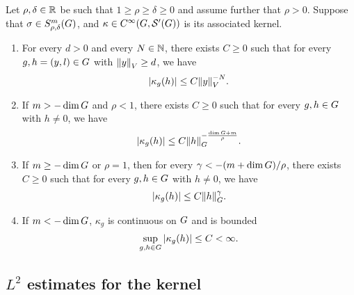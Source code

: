 \begin{theorem}
\label{theorem:kernel_estimates}
    Let $\rho, \delta \in \R$ be such that $1 \geq \rho \geq \delta \geq 0$
    and assume further that $\rho > 0$.
    Suppose that $\sigma \in \SymbolClass{m}{\rho, \delta}$,
    and $\kappa \in \SmoothFunctions {\Group, \TemperedDistributions \Group}$ is its associated kernel.
    \begin{enumerate}
        \item \label{item:kernel_estimates:at_infinity}
            For every $d > 0$ and every $N \in \N$,
            there exists $C \geq 0$ such that for every $g, h = (y, l) \in \Group$ with $\norm {y} \geq d$, we have
            \begin{align*}
                \abs{\kappa_g(h)} \leq C \norm y^{-N}.
            \end{align*}
        \item \label{item:kernel_estimates:at_origin:positive}
            If $m > - \dim \Group$ and $\rho < 1$, there exists $C \geq 0$ such that for every $g, h \in \Group$ with $h \neq 0$, we have
            \begin{align*}
                \abs{\kappa_g(h)} \leq C \norm [\Group] h^{- \frac{\dim \Group + m}{\rho}}.
            \end{align*}
        \item \label{item:kernel_estimates:at_origin:zero}
            If $m \geq -\dim \Group$ or $\rho = 1$,
            then for every $\gamma < -(m + \dim \Group)/\rho$,
            there exists $C \geq 0$ such that for every $g, h \in \Group$ with $h \neq 0$, we have
            \begin{align*}
                \abs{\kappa_g(h)} \leq C \norm [\Group] h^\gamma.
            \end{align*}
        \item \label{item:kernel_estimates:at_origin:negative}
            If $m < -\dim \Group$, $\kappa_g$ is continuous on $\Group$ and is bounded
            \begin{align*}
                \sup_{g, h \in \Group} \abs{\kappa_g(h)} \leq C < \infty.
            \end{align*}
    \end{enumerate}
\end{theorem}

\subsection{\texorpdfstring{$L^2$}{L2} estimates for the kernel}

